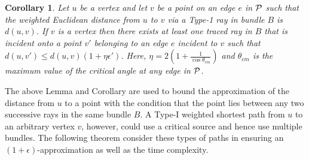 \documentclass[11pt]{article}
\newtheorem{cor}{Corollary}
\begin{document}
\begin{cor}
\label{cor:errorX}
Let $u$ be a vertex and let $v$ be a point on an edge $e$ in $\cal{P}$ such that the weighted Euclidean distance from $u$ to $v$ via a Type-1 ray in  bundle $B$ is $d(u,v)$.
If $v$ is a vertex then there exists at least one traced ray in $B$ that is incident onto a point $v'$ belonging to an edge $e$ incident to $v$ such that $d(u,v') \leq d(u,v)(1+\eta \epsilon')$.
Here, $\eta= 2(1+ \frac{1}{\cos{\theta_{cm}}})$ and $\theta_{cm}$ is the maximum value of the critical angle at any edge in $\cal{P}$. 
\end{cor}

The above Lemma and Corollary are used to bound the approximation of the distance from $u$ to a point with the condition that the point lies between any two successive rays in the same  bundle $B$.
A Type-I weighted shortest path from $u$ to an arbitrary vertex $v$, however, could use a critical source and hence use multiple bundles.
The following theorem consider these types of paths in ensuring an $(1+\epsilon)$-approximation as well as the time complexity. 
\end{document}
